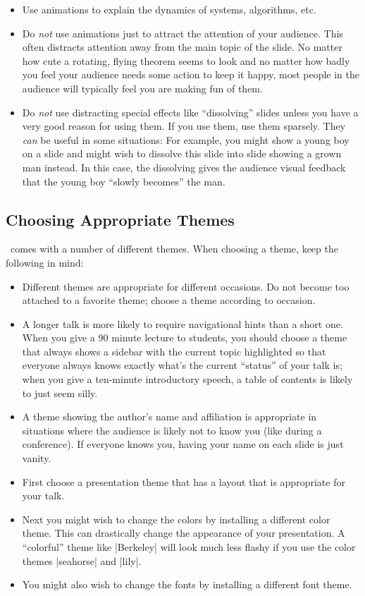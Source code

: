 \begin{itemize}
\item
  Use animations to explain the dynamics of systems, algorithms, etc.
\item
  Do \emph{not} use animations just to attract the attention of your audience. This often distracts attention away from the main topic of the slide. No matter how cute a rotating, flying theorem seems to look and no matter how badly you feel your audience needs some action to keep it happy, most people in the audience will typically feel you are making fun of them.
\item
  Do \emph{not} use distracting special effects like ``dissolving'' slides unless you have a very good reason for using them. If you use them, use them sparsely. They \emph{can} be useful in some situations: For example, you might show a young boy on a slide and might wish to dissolve this slide into slide showing a grown man instead. In this case, the dissolving  gives the audience visual feedback that the young boy ``slowly becomes'' the man.
\end{itemize}


\subsection{Choosing Appropriate Themes}

\beamer\ comes with a number of different themes. When choosing a theme, keep the following in mind:
\begin{itemize}
\item
  Different themes are appropriate for different occasions. Do not become too attached to a favorite theme; choose a theme according to occasion.
\item
  A longer talk is more likely to require navigational hints than a short one. When you give a 90 minute lecture to students, you should choose a theme that always shows a sidebar with the current topic highlighted so that everyone always knows exactly what's the current ``status'' of your talk is; when you give a ten-minute introductory speech, a table of contents is likely to just seem silly.
\item
  A theme showing the author's name and affiliation is appropriate in situations where the audience is likely not to know you (like during a conference). If everyone knows you, having your name on each slide is just vanity.
\item
  First choose a presentation theme that has a layout that is appropriate for your talk.
\item
  Next you might wish to change the colors by installing a different color theme. This can drastically change the appearance of your presentation. A ``colorful'' theme like |Berkeley| will look much less flashy if you use the color themes |seahorse| and |lily|.
\item
  You might also wish to change the fonts by installing a different font theme.
\end{itemize}


